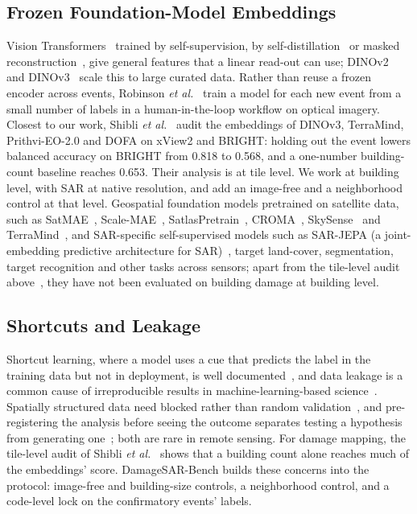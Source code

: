 \documentclass{ieeeaccess}
\begin{document}
\subsection{Frozen Foundation-Model Embeddings}
Vision Transformers~\cite{dosovitskiy2021vit} trained by self-supervision, by self-distillation~\cite{caron2021dino} or masked reconstruction~\cite{he2022mae}, give general features that a linear read-out can use; DINOv2~\cite{oquab2024dinov2} and DINOv3~\cite{simeoni2026dinov3} scale this to large curated data. Rather than reuse a frozen encoder across events, Robinson \emph{et al.}~\cite{robinson2023rapid} train a model for each new event from a small number of labels in a human-in-the-loop workflow on optical imagery. Closest to our work, Shibli \emph{et al.}~\cite{shibli2026shortcut} audit the embeddings of DINOv3, TerraMind, Prithvi-EO-2.0 and DOFA on xView2 and BRIGHT: holding out the event lowers balanced accuracy on BRIGHT from 0.818 to 0.568, and a one-number building-count baseline reaches 0.653. Their analysis is at tile level. We work at building level, with SAR at native resolution, and add an image-free and a neighborhood control at that level. Geospatial foundation models pretrained on satellite data, such as SatMAE~\cite{cong2022satmae}, Scale-MAE~\cite{reed2023scalemae}, SatlasPretrain~\cite{bastani2023satlas}, CROMA~\cite{fuller2023croma}, SkySense~\cite{guo2024skysense} and TerraMind~\cite{jakubik2025terramind}, and SAR-specific self-supervised models such as SAR-JEPA (a joint-embedding predictive architecture for SAR)~\cite{li2024sarjepa}, target land-cover, segmentation, target recognition and other tasks across sensors; apart from the tile-level audit above~\cite{shibli2026shortcut}, they have not been evaluated on building damage at building level.

\subsection{Shortcuts and Leakage}
Shortcut learning, where a model uses a cue that predicts the label in the training data but not in deployment, is well documented~\cite{geirhos2020shortcut}, and data leakage is a common cause of irreproducible results in machine-learning-based science~\cite{kapoor2023leakage}. Spatially structured data need blocked rather than random validation~\cite{roberts2017cv}, and pre-registering the analysis before seeing the outcome separates testing a hypothesis from generating one~\cite{nosek2018prereg}; both are rare in remote sensing. For damage mapping, the tile-level audit of Shibli \emph{et al.}~\cite{shibli2026shortcut} shows that a building count alone reaches much of the embeddings' score. DamageSAR-Bench builds these concerns into the protocol: image-free and building-size controls, a neighborhood control, and a code-level lock on the confirmatory events' labels.
\end{document}
